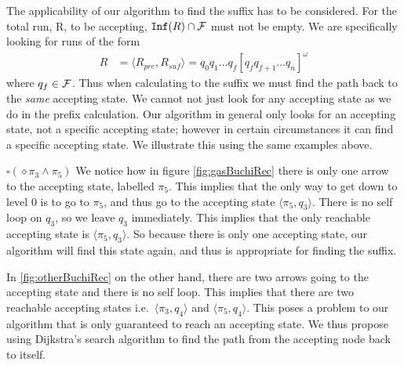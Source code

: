 The applicability of our algorithm to find the suffix has to be considered. For the total run, R, to be accepting, $\texttt{Inf}(R) \cap \mathcal{F}$ must not be empty. We are specifically looking for runs of the form 
\begin{align*}
R &= \langle R_{pre}, R_{suf} \rangle = q_0 q_1 \dots q_f [q_f q_{f+1} \dots q_n]^\omega
\end{align*}     
where $q_f \in \mathcal{F}$. Thus when calculating to the suffix we must find the path back to the \textit{same} accepting state. We cannot not just look for any accepting state as we do in the prefix calculation. Our algorithm in general only looks for an accepting state, not a specific accepting state; however in certain circumstances it can find a specific accepting state. We illustrate this using the same examples above. 

$\square (\diamond \pi_3 \wedge \pi_5)$ 
We notice how in figure \ref{fig:gasBuchiRec} there is only one arrow to the accepting state, labelled $\pi_5$. This implies that the only way to get down to level 0 is to go to $\pi_5$, and thus go to the accepting state $\langle \pi_5, q_3 \rangle$. There is no self loop on $q_3$, so we leave $q_3$ immediately. This implies that the only reachable accepting state is $\langle \pi_5, q_3 \rangle$. So because there is only one accepting state, our algorithm will find this state again, and thus is appropriate for finding the suffix. 

In \ref{fig:otherBuchiRec} on the other hand, there are two arrows going to the accepting state and there is no self loop. This implies that there are two reachable accepting states i.e.\ $\langle \pi_3, q_4 \rangle$ and $\langle \pi_5, q_4 \rangle$. This poses a problem to our algorithm that is only guaranteed to reach an accepting state. We thus propose using Dijkstra's search algorithm to find the path from the accepting node back to itself.   